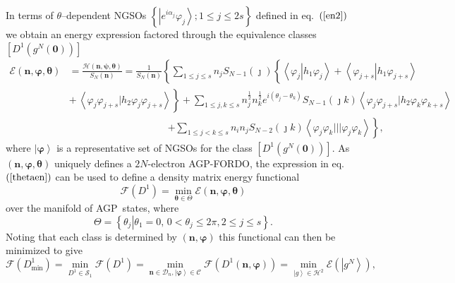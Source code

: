 \documentclass[aps,preprint]{revtex4}%
\begin{document}
In terms of $\theta$--dependent NGSOs $\left\{  \left\vert e^{i\alpha_{j}%
}\varphi_{j}\right\rangle ;1\leq j\leq2s\right\}  $ defined in eq.\ $\left(
\ref{en2}\right)  $ we obtain an energy expression factored through the
equivalence classes $\left[  D^{1}\left(  g^{N}\left(  \mathbf{0}\right)
\right)  \right]  $
\begin{align}
\mathcal{E}\left(  \mathbf{n},\mathbf{\varphi},\mathbf{\theta}\right)   &
=\frac{\mathcal{H}\left(  \mathbf{n},\mathbf{\psi},\mathbf{\theta}\right)
}{S_{N}\left(  \mathbf{n}\right)  }=\frac{1}{S_{N}\left(  \mathbf{n}\right)
}\left\{  \sum_{1\leq j\leq s}n_{j}S_{N-1}\left(  \jmath\right)  \left\{
\overset{}{\left\langle \varphi_{j}\left\vert h_{1}\varphi_{j}\right.
\right\rangle +\left\langle \varphi_{j+s}\left\vert h_{1}\varphi_{j+s}\right.
\right\rangle }\right.  \right. \nonumber\\
&  \left.  +\overset{}{\,\left\langle \varphi_{j}\varphi_{j+s}|h_{2}%
\varphi_{j}\varphi_{j+s}\right\rangle }\right\}  +\sum_{1\leq j,k\leq s}%
n_{j}^{\frac{1}{2}}n_{k}^{\frac{1}{2}}e^{i\left(  \theta_{j}-\theta
_{k}\right)  }S_{N-1}\left(  \jmath k\right)  \left\langle \varphi_{j}%
\varphi_{j+s}|h_{2}\varphi_{k}\varphi_{k+s}\right\rangle \nonumber\\
&  \qquad\qquad\qquad\qquad\qquad\left.  +\sum_{1\leq j<k\leq s}n_{i}%
n_{j}S_{N-2}\left(  \jmath k\right)  \left\langle \varphi_{j}\varphi
_{k}|||\varphi_{j}\varphi_{k}\right\rangle \right\}  , \label{thetaen}%
\end{align}
where $\left\vert \mathbf{\varphi}\right\rangle $ is a representative set of
NGSOs for the class $\left[  D^{1}\left(  g^{N}\left(  \mathbf{0}\right)
\right)  \right]  $. As $\left(  \mathbf{n},\mathbf{\varphi,\theta}\right)  $
uniquely defines a $2N$-electron AGP-FORDO, the expression in eq.\ $\left(
\ref{thetaen}\right)  $ can be used to define a density matrix energy
functional
\begin{equation}
\mathcal{F}\left(  D^{1}\right)  =\min_{\mathbf{\theta\in}\Theta}%
\mathcal{E}\left(  \mathbf{n},\mathbf{\varphi},\mathbf{\theta}\right)
\end{equation}
over the manifold of AGP\ states, where
\begin{equation}
\Theta=\left\{  \left.  \theta_{j}\right\vert \theta_{1}=0,\,0<\theta_{j}%
\leq2\pi,2\leq j\leq s\right\}  .
\end{equation}
Noting that each class is determined by $\left(  \mathbf{n},\mathbf{\varphi
}\right)  $ this functional can then be minimized to give
\begin{equation}
\mathcal{F}\left(  D_{\min}^{1}\right)  =\min_{D^{1}\in\mathcal{S}_{1}%
}\mathcal{F}\left(  D^{1}\right)  =\min_{\mathbf{n\in}\mathcal{D}%
_{n},\left\vert \mathbf{\varphi}\right\rangle \in\mathcal{C}}\mathcal{F}%
\left(  D^{1}\left(  \mathbf{n},\mathbf{\varphi}\right)  \right)
=\min_{\left\vert g\right\rangle \in\mathcal{H}^{2}}\mathcal{E}\left(
\left\vert g^{N}\right\rangle \right)  , \label{MinDMF}%
\end{equation}
\end{document}
